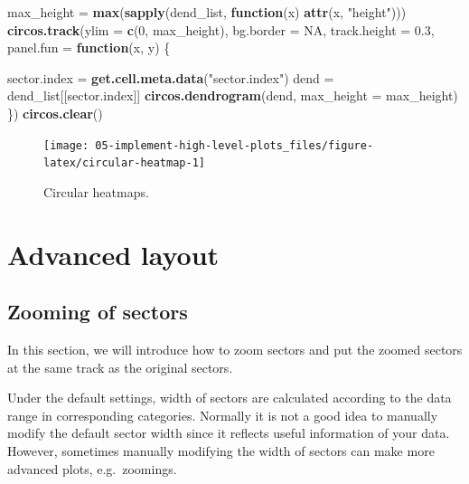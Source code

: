 \documentclass[]{book}
\newenvironment{Shaded}{\begin{snugshade}}{\end{snugshade}}
\newcommand{\KeywordTok}[1]{\textcolor[rgb]{0.13,0.29,0.53}{\textbf{#1}}}
\newcommand{\DataTypeTok}[1]{\textcolor[rgb]{0.13,0.29,0.53}{#1}}
\newcommand{\DecValTok}[1]{\textcolor[rgb]{0.00,0.00,0.81}{#1}}
\newcommand{\FloatTok}[1]{\textcolor[rgb]{0.00,0.00,0.81}{#1}}
\newcommand{\StringTok}[1]{\textcolor[rgb]{0.31,0.60,0.02}{#1}}
\newcommand{\OtherTok}[1]{\textcolor[rgb]{0.56,0.35,0.01}{#1}}
\newcommand{\ControlFlowTok}[1]{\textcolor[rgb]{0.13,0.29,0.53}{\textbf{#1}}}
\newcommand{\NormalTok}[1]{#1}
\begin{document}
\begin{Shaded}
\begin{Highlighting}[]
\NormalTok{max_height =}\StringTok{ }\KeywordTok{max}\NormalTok{(}\KeywordTok{sapply}\NormalTok{(dend_list, }\ControlFlowTok{function}\NormalTok{(x) }\KeywordTok{attr}\NormalTok{(x, }\StringTok{"height"}\NormalTok{)))}
\KeywordTok{circos.track}\NormalTok{(}\DataTypeTok{ylim =} \KeywordTok{c}\NormalTok{(}\DecValTok{0}\NormalTok{, max_height), }\DataTypeTok{bg.border =} \OtherTok{NA}\NormalTok{, }\DataTypeTok{track.height =} \FloatTok{0.3}\NormalTok{, }
    \DataTypeTok{panel.fun =} \ControlFlowTok{function}\NormalTok{(x, y) \{}

\NormalTok{        sector.index =}\StringTok{ }\KeywordTok{get.cell.meta.data}\NormalTok{(}\StringTok{"sector.index"}\NormalTok{)}
\NormalTok{        dend =}\StringTok{ }\NormalTok{dend_list[[sector.index]]}
        \KeywordTok{circos.dendrogram}\NormalTok{(dend, }\DataTypeTok{max_height =}\NormalTok{ max_height)}
\NormalTok{\})}
\KeywordTok{circos.clear}\NormalTok{()}
\end{Highlighting}
\end{Shaded}

\begin{figure}

{\centering \texttt{[image: 05-implement-high-level-plots\_files/figure-latex/circular-heatmap-1]} 

}

\caption{Circular heatmaps.}\label{fig:circular-heatmap}
\end{figure}

\chapter{Advanced layout}\label{advanced-layout}

\section{Zooming of sectors}\label{zooming-of-sectors}

In this section, we will introduce how to zoom sectors and put the
zoomed sectors at the same track as the original sectors.

Under the default settings, width of sectors are calculated according to
the data range in corresponding categories. Normally it is not a good
idea to manually modify the default sector width since it reflects
useful information of your data. However, sometimes manually modifying
the width of sectors can make more advanced plots, e.g.~zoomings.
\end{document}
